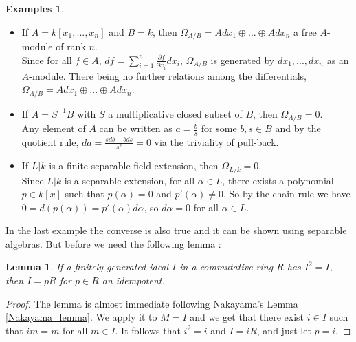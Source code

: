 \documentclass{article}
\theoremstyle{plain}
\newtheorem{lemma}[theorem]{Lemma}
\theoremstyle{definition}
\newtheorem{examples}[theorem]{Examples}
\begin{document}
\begin{examples}\textbf{ }
\label{example_kahler}
\begin{itemize}
    
    \item[$a)$] If $A = k[x_1,...,x_n]$ and $B=k$, then $\Omega_{A/B} = Adx_1 \oplus ...\oplus Adx_n$ a free $A$-module of rank $n$.\\
    Since for all $f\in A$, $df = \sum_{i=1}^n \frac{\partial f}{\partial x_i} dx_i$, $\Omega_{A/B}$ is generated by $dx_1, ..., dx_n$ as an $A$-module. There being no further relations among the differentials, $\Omega_{A/B} = Adx_1 \oplus ...\oplus Adx_n$. 
    
    
    \item[$b)$] If $A =S^{-1}B$ with $S$ a multiplicative closed subset of $B$, then $\Omega_{A/B} = 0$.\\
    Any element of $A$ can be written as $a=\frac{b}{s}$ for some $b,s\in B$ and by the quotient rule, $da = \frac{sdb-bds}{s^2}=0$ via the triviality of pull-back.
    
    \item[$c)$] If $L|k$ is a finite separable field extension, then $\Omega_{L/k} = 0$.\\
    Since $L|k$ is a separable extension, for all $\alpha\in L$, there exists a polynomial $p\in k[x]$ such that $p(\alpha)=0$ and $p'(\alpha)\neq 0$. So by the chain rule we have $0 = d(p(\alpha)) = p'(\alpha)d\alpha$, so $d\alpha=0$ for all $\alpha\in L$.
\end{itemize}
\end{examples}


\noindent In the last example the converse is also true and it can be shown using separable algebras. 
But before we need the following lemma : 
\begin{lemma}
    If a finitely generated ideal $I$ in a commutative ring $R$ has $I^2=  I$, then $I = pR$ for $p\in R$ an idempotent.
\end{lemma}
\begin{proof}
    The lemma is almost immediate following Nakayama's Lemma \ref{Nakayama_lemma}.
    We apply it to $M = I$ and we get that there exist $i\in I$ such that $im =m$ for all $m\in I$. 
    It follows that $i^2 = i$ and $I = iR$, and just let $p=i$.
\end{proof}
\end{document}
